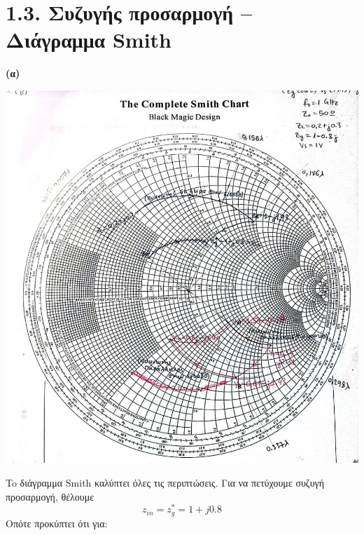 \documentclass[12pt]{article}
\begin{document}
\section*{1.3. Συζυγής προσαρμογή – Διάγραμμα Smith}
\textbf{(α)}
\begin{center}
    \includegraphics*[scale=0.7]{1-3-a.jpg}
\end{center}

To διάγραμμα Smith καλύπτει όλες τις περιπτώσεις.
Για να πετύχουμε συζυγή προσαρμογή, θέλουμε 
\[
    z_{in} = z^*_g = 1 + j0.8
    \]
Οπότε προκύπτει ότι για: 
\end{document}
